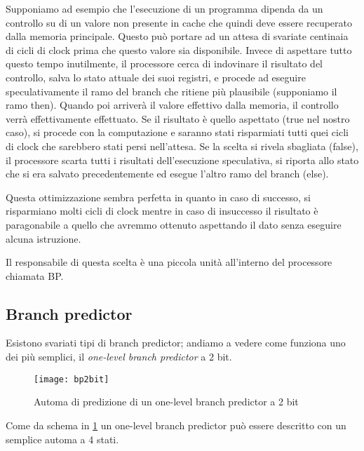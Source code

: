 		Supponiamo ad esempio che l'esecuzione di un programma dipenda da un controllo su di un valore non presente in cache che quindi deve essere recuperato dalla memoria principale. Questo può portare ad un attesa di svariate centinaia di cicli di clock prima che questo valore sia disponibile. Invece di aspettare tutto questo tempo inutilmente, il processore cerca di indovinare il risultato del controllo, salva lo stato attuale dei suoi registri, e procede ad eseguire speculativamente il ramo del branch che ritiene più plausibile (supponiamo il ramo then). Quando poi arriverà il valore effettivo dalla memoria, il controllo verrà effettivamente effettuato. Se il risultato è quello aspettato (true nel nostro caso), si procede con la computazione e saranno stati risparmiati tutti quei cicli di clock che sarebbero stati persi nell'attesa. Se la scelta si rivela sbagliata (false), il processore scarta tutti i risultati dell'esecuzione speculativa, si riporta allo stato che si era salvato precedentemente ed esegue l'altro ramo del branch (else).
		
		Questa ottimizzazione sembra perfetta in quanto in caso di successo, si risparmiano molti cicli di clock mentre in caso di insuccesso il risultato è paragonabile a quello che avremmo ottenuto aspettando il dato senza eseguire alcuna istruzione.
		
		Il responsabile di questa scelta è una piccola unità all'interno del processore chiamata \ac{BP}.
		
		\subsection{Branch predictor}
			Esistono svariati tipi di branch predictor; andiamo a vedere come funziona uno dei più semplici, il \emph{one-level branch predictor} a 2 bit.
			
			\begin{figure}
				\begin{center}
					\texttt{[image: bp2bit]}
					\caption{Automa di predizione di un one-level branch predictor a 2 bit}
					\label{fig:bp2bits}
				\end{center}
			\end{figure}
		
			Come da schema in \cref{fig:bp2bits} un one-level branch predictor può essere descritto con un semplice automa a 4 stati.
			
